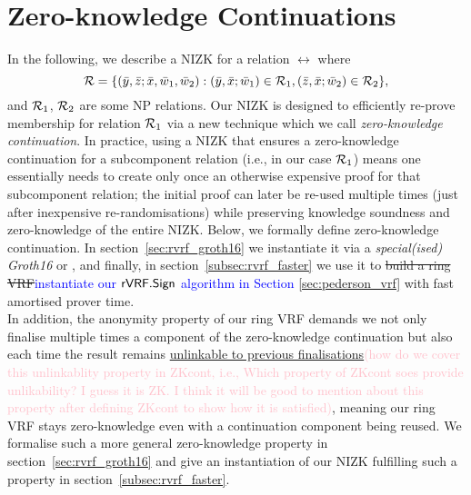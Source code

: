 
\newcommand{\handan}[2]{{\sout{#1}}\textcolor{blue}{#2}}

\newcommand{\qhandan}[2]{{\uline{#1}}\textcolor{pink}{(#2)}}

\section{Zero-knowledge Continuations}
\label{sec:rvrf_cont}

\noindent In the following, we describe a NIZK for a relation $\rel$ where
$$\mathcal{R} = \{(\bar{y}, \bar{z}; \bar{x}, \bar{w}_1, \bar{w}_2):  (\bar{y}, \bar{x}; \bar{w}_1) \in \mathcal{R}_1, (\bar{z}, \bar{x}; \bar{w}_2) \in \mathcal{R}_2 \},$$
and $\mathcal{R}_1$, $\mathcal{R}_2$ are some NP relations. Our NIZK is designed to efficiently re-prove membership for relation $\mathcal{R}_1$
via a new technique which we call \emph{zero-knowledge continuation}. In practice, using a NIZK that ensures a zero-knowledge continuation for a 
subcomponent relation (i.e., in our case $\mathcal{R}_1$) means one essentially needs to create only once an otherwise expensive proof for that subcomponent 
relation; the initial proof can later be re-used multiple times (just after inexpensive re-randomisations) 
while preserving knowledge soundness and zero-knowledge of the entire NIZK. 
Below, we formally define zero-knowledge continuation. In section~\ref{sec:rvrf_groth16} we instantiate it via a \emph{special(ised) 
Groth16} or \SpecialG, and finally, in section~\ref{subsec:rvrf_faster} we use it to \handan{build a ring VRF}{instantiate our $ {\mathsf{rVRF}}.{\mathsf{Sign}} $ algorithm in Section \ref{sec:pederson_vrf}} with fast amortised prover time. \\

\noindent In addition, the anonymity property of our ring VRF demands we not only finalise multiple times a component of the zero-knowledge 
continuation but also each time the result remains \qhandan{unlinkable to previous finalisations}{how do we cover this unlinkablity property in ZKcont, i.e., Which property of ZKcont soes provide unlikability? I guess it is ZK. I think it will be good to mention about this property after defining ZKcont to show how it is satisfied}, meaning our ring VRF stays zero-knowledge 
even with a continuation component being reused. We formalise such a more general zero-knowledge property in 
section~\ref{sec:rvrf_groth16} and give an instantiation of our NIZK fulfilling such a property in section~\ref{subsec:rvrf_faster}. 


